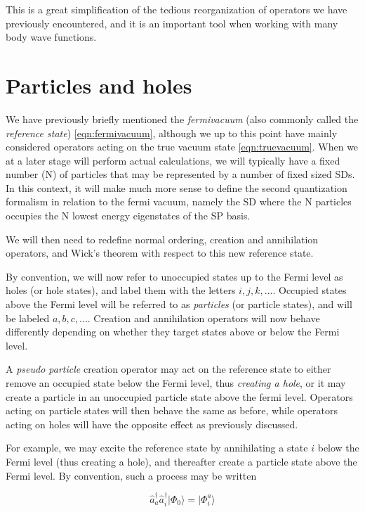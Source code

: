 This is a great simplification of the tedious reorganization of operators we have previously encountered, and it is an important tool when working with many body wave functions.

\section{Particles and holes}

We have previously briefly mentioned the \emph{fermivacuum} (also commonly called the \emph{reference state}) \ref{eqn:fermivacuum}, although we up to this point have mainly considered operators acting on the true vacuum state \ref{eqn:truevacuum}. When we at a later stage will perform actual calculations, we will typically have a fixed number (N) of particles that may be represented by a number of fixed sized SDs. In this context, it will make much more sense to define the second quantization formalism in relation to the fermi vacuum, namely the SD where the N particles occupies the N lowest energy eigenstates of the SP basis.  

We will then need to redefine normal ordering, creation and annihilation operators, and Wick's theorem with respect to this new reference state. 

By convention, we will now refer to unoccupied states up to the Fermi level as holes (or hole states), and label them with the letters $i,j,k,...$. Occupied states above the Fermi level will be referred to as \emph{particles} (or particle states), and will be labeled $a,b,c,...$. Creation and annihilation operators will now behave differently depending on whether they target states above or below the Fermi level. 

A \emph{pseudo particle} creation operator may act on the reference state to either remove an occupied state below the Fermi level, thus \emph{creating a hole}, or it may create a particle in an unoccupied particle state above the fermi level. Operators acting on particle states will then behave the same as before, while operators acting on holes  will have the opposite effect as previously discussed.

For example, we may excite the reference state by annihilating a state $i$ below the Fermi level (thus creating a hole), and thereafter create a particle state above the Fermi level. By convention, such a process may be written

\begin{equation}
\hat{a}_a^\dagger \hat{a}_i^\dagger \vert \Phi_0 \rangle = \vert \Phi_i^a \rangle 
\label{eqn:excitation}
\end{equation}

